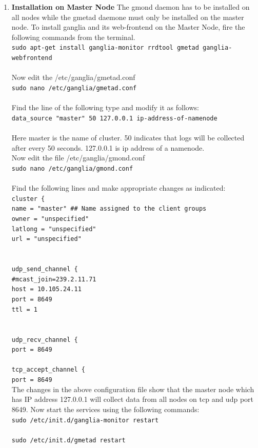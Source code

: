 \documentclass[12pt]{book}
\newcommand{\shellcmd}[1]{\\\indent\texttt{\footnotesize #1}\\}
\begin{document}
\begin{enumerate}
\item \textbf{Installation on Master Node}
The gmond daemon has to be installed on all nodes while the gmetad daemone must only
be installed on the master node. To install ganglia and its web-frontend on the Master
Node, fire the following commands from the terminal.\cite{ganglia}
\shellcmd{sudo apt-get install ganglia-monitor rrdtool gmetad ganglia-webfrontend}\\\noindent
Now edit the /etc/ganglia/gmetad.conf
\shellcmd{sudo nano /etc/ganglia/gmetad.conf}\\\noindent
Find the line of the following type and modify it as follows:
\shellcmd{data\_source "master" 50 127.0.0.1 ip-address-of-namenode}\\\noindent
Here master is the name of cluster. 50 indicates that logs will be collected after every 50 seconds. 127.0.0.1 is ip address of a namenode.\\
Now edit the file /etc/ganglia/gmond.conf
\shellcmd{sudo nano /etc/ganglia/gmond.conf}\\
Find the following lines and make appropriate changes as indicated:
\shellcmd{cluster \{ \\\indent 
name = "master" \#\# Name assigned to the client groups\\\indent 
owner = "unspecified"\\\indent 
latlong = "unspecified"\\\indent 
url = "unspecified"\\\indent}
\shellcmd{udp\_send\_channel \{ \\\indent 
\#mcast\_join=239.2.11.71\\\indent 
host = 10.105.24.11\\\indent 
port = 8649\\\indent 
ttl = 1\\\indent }
\shellcmd{udp\_recv\_channel \{ \\\indent 
port = 8649}
\shellcmd{tcp\_accept\_channel \{ \\\indent 
port = 8649}
The changes in the above configuration file show that the master node which has IP
address 127.0.0.1 will collect data from all nodes on tcp and udp port 8649.
Now start the services using the following commands:
\shellcmd{sudo /etc/init.d/ganglia-monitor restart}
\shellcmd{sudo /etc/init.d/gmetad restart}


\end{enumerate}
\end{document}
